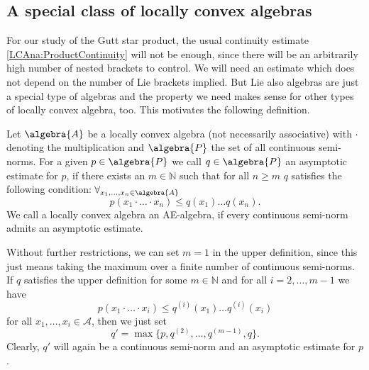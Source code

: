 \subsection{A special class of locally convex algebras}

For our study of the Gutt star product, the usual continuity estimate 
\eqref{LCAna:ProductContinuity} will not be enough, since 
there will be an arbitrarily high number of nested brackets to control. 
We will need an estimate which does not depend on the number of Lie 
brackets implied. But Lie also algebras are just a special type of algebras  
and the property we need makes sense for other types of locally convex 
algebra, too. This motivates the following definition.
\begin{definition}
	\label{Def:AE}
	Let $\algebra{A}$ be a locally convex algebra (not necessarily 
	associative) with $\cdot$ denoting the multiplication 
	and $\algebra{P}$ the set of all continuous semi-norms. 
	For a given $p \in \algebra{P}$ we call $q \in \algebra{P}$ an asymptotic 
	estimate for $p$, if there exists an $m \in \mathbb{N}$ such that for all 
	$n \geq m$ $q$ satisfies the following condition: $\forall_{x_1, \ldots, 
	x_n \in \algebra{A}}$
	\begin{equation}
		\label{LCAna:AE}
		p(x_1 \cdot \ldots \cdot x_n)
		\leq
		q(x_1) \ldots q(x_n).
	\end{equation}
	We call a locally convex algebra an AE-algebra, if every continuous 
	semi-norm admits an asymptotic estimate.
\end{definition}
\begin{remark}
	\label{Rem:AE1}
	Without further restrictions, we can set $m = 1$ in the upper definition, 
	since this just means taking the maximum over a finite number of 
	continuous semi-norms. If $q$ satisfies the upper definition for some $m 
	\in \mathbb{N}$ and for all $i = 2, \ldots, m-1$ we have
	\begin{equation*}
		p(x_1 \cdot \ldots \cdot x_i)
		\leq
		q^{(i)}(x_1) \ldots q^{(i)}(x_i)
	\end{equation*}
	for all $x_1, \ldots, x_i \in \mathcal{A}$, then we just set
	\begin{equation*}
		q'
		=
		\max\{ 
			p, q^{(2)}, \ldots, q^{(m-1)}, q
		\}.
	\end{equation*}
	Clearly, $q'$ will again be a continuous semi-norm and an asymptotic 
	estimate for $p$.
\end{remark}
